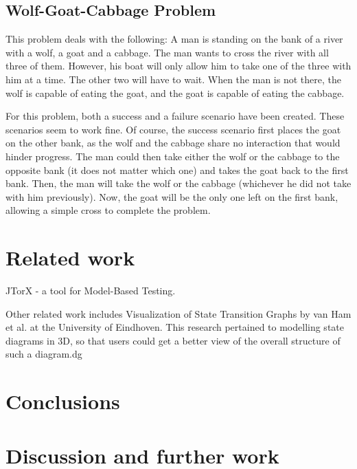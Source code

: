 \documentclass[11pt,a4paper,twocolumn]{article}
\begin{document}
\subsection{Wolf-Goat-Cabbage Problem}
This problem deals with the following: A man is standing on the bank of a river with a wolf, a goat and a cabbage. The man wants to cross the river with all three of them. However, his boat will only allow him to take one of the three with him at a time. The other two will have to wait. When the man is not there, the wolf is capable of eating the goat, and the goat is capable of eating the cabbage.

For this problem, both a success and a failure scenario have been created. These scenarios seem to work fine.
Of course, the success scenario first places the goat on the other bank, as the wolf and the cabbage share no interaction that would hinder progress. The man could then take either the wolf or the cabbage to the opposite bank (it does not matter which one) and takes the goat back to the first bank. Then, the man will take the wolf or the cabbage (whichever he did not take with him previously). Now, the goat will be the only one left on the first bank, allowing a simple cross to complete the problem.

\section{Related work}
JTorX - a tool for Model-Based Testing.

Other related work includes Visualization of State Transition Graphs by van Ham et al. at the University of Eindhoven. This research pertained to modelling state diagrams in 3D, so that users could get a better view of the overall structure of such a diagram.dg

\section{Conclusions}




\section{Discussion and further work}
\end{document}
